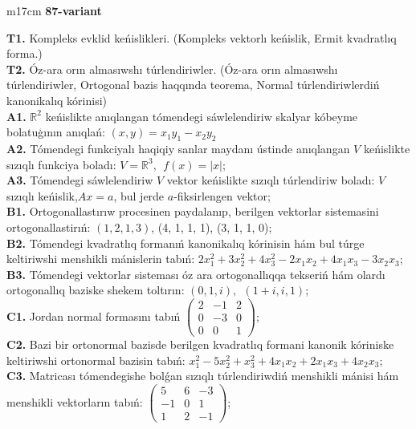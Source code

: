 \documentclass{article}
\begin{document}
\vspace{1cm}


\begin{tabular}{m{17cm}}
\textbf{87-variant}
\newline

\textbf{T1.} Kompleks evklid keńislikleri.  (Kompleks vektorlı keńislik, Ermit kvadratlıq forma.) \\
\textbf{T2.} Óz-ara orın almasıwshı túrlendiriwler. (Óz-ara orın almasıwshı túrlendiriwler,  Ortogonal bazis haqqında teorema,  Normal túrlendiriwlerdiń kanonikalıq kórinisi) \\
\textbf{A1.} \(\mathbb{R}^{2}\) keńislikte anıqlangan tómendegi sáwlelendiriw skalyar kóbeyme bolatuģının anıqlań: \((x,y) = x_{1}y_{1} - x_{2}y_{2}\) \\
\textbf{A2.} Tómendegi funkciyalı haqiqiy sanlar maydanı ústinde anıqlangan \(V\) keńislikte sızıqlı funkciya boladı: \(V = \mathbb{R}^{3},\ \ f(x) = |x|\); \\
\textbf{A3.} Tómendegi sáwlelendiriw \(V\) vektor keńislikte sızıqlı túrlendiriw boladı: \(V\) sızıqlı keńislik,\(Ax = a\), bul jerde \(a\)-fiksirlengen vektor; \\
\textbf{B1.} Ortogonallastırıw procesinen paydalanıp, berilgen vektorlar sistemasini ortogonallastirıń: \((1,2,1,3)\), (4, 1, 1, 1), (3, 1, 1, 0); \\
\textbf{B2.} Tómendegi kvadratlıq formanıń kanonikalıq kórinisin hám bul túrge keltiriwshi menshikli mánislerin tabıń: \(2x_{1}^{2} + 3x_{2}^{2} + 4x_{3}^{2} - 2x_{1}x_{2} + 4x_{1}x_{3} - 3x_{2}x_{3}\); \\
\textbf{B3.} Tómendegi vektorlar sisteması óz ara ortogonallıqqa tekseriń hám olardı ortogonallıq baziske shekem toltırın: \((0,1,i),\ \ (1 + i,i,1)\); \\
\textbf{C1.} Jordan normal formasını tabıń \(\begin{pmatrix} 2 & - 1 & 2 \\ 0 & - 3 & 0 \\ 0 & 0 & 1 \end{pmatrix}\); \\
\textbf{C2.} Bazi bir ortonormal bazisde berilgen kvadratlıq formani kanonik kóriniske keltiriwshi ortonormal bazisin tabıń: \(x_{1}^{2} - 5x_{2}^{2} + x_{3}^{2} + 4x_{1}x_{2} + 2x_{1}x_{3} + 4x_{2}x_{3}\); \\
\textbf{C3.} Matricası tómendegishe bolǵan sızıqlı túrlendiriwdiń menshikli mánisi hám menshikli vektorların tabıń: \(\begin{pmatrix} 5 & 6 & - 3 \\  - 1 & 0 & 1 \\ 1 & 2 & - 1 \end{pmatrix}\); \\

\end{tabular}
\vspace{1cm}
\end{document}
